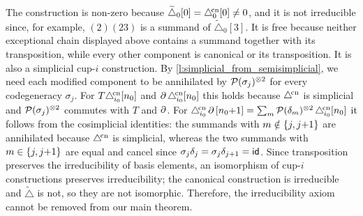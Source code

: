 \medskip\noindent
The construction is non-zero because $\widetilde\triangle_0[0]=\triangle^{\!\mathrm{cn}}_0[0]\neq0$, and it is not irreducible since, for example, $(2)(23)$ is a summand of $\widetilde\triangle_0[3]$.
It is free because neither exceptional chain displayed above contains a summand together with its transposition, while every other component is canonical or its transposition.
It is also a simplicial \mbox{cup-$i$} construction.
By \cref{l:simplicial_from_semisimplicial}, we need each modified component to be annihilated by $\mathcal{P}(\sigma_j)^{\otimes 2}$ for every codegeneracy $\sigma_j$.
For $T\triangle^{\!\mathrm{cn}}_{i_0}[n_0]$ and $\operatorname{\partial}\triangle^{\!\mathrm{cn}}_{i_0}[n_0]$ this holds because $\triangle^{\!\mathrm{cn}}$ is simplicial and $\mathcal{P}(\sigma_j)^{\otimes 2}$ commutes with $T$ and $\operatorname{\partial}$.
For $\triangle^{\!\mathrm{cn}}_{i_0}\operatorname{\partial}\,[n_0{+}1] = \sum_{m} \mathcal{P}(\delta_m)^{\otimes 2}\, \triangle^{\!\mathrm{cn}}_{i_0}[n_0]$ it follows from the cosimplicial identities: the summands with $m \notin \{j, j{+}1\}$ are annihilated because $\triangle^{\!\mathrm{cn}}$ is simplicial, whereas the two summands with $m \in \{j, j{+}1\}$ are equal and cancel since $\sigma_j \delta_j = \sigma_j \delta_{j+1} = \mathsf{id}$.
Since transposition preserves the irreducibility of basis elements, an isomorphism of \mbox{cup-$i$} constructions preserves irreducibility; the canonical construction is irreducible and $\widetilde\triangle$ is not, so they are not isomorphic.
Therefore, the irreducibility axiom cannot be removed from our main theorem.
